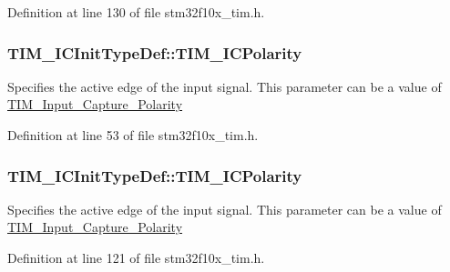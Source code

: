 Definition at line 130 of file stm32f10x\+\_\+tim.\+h.

\subsubsection[{\texorpdfstring{T\+I\+M\+\_\+\+I\+C\+Polarity}{TIM_ICPolarity}}]{ T\+I\+M\+\_\+\+I\+C\+Init\+Type\+Def\+::\+T\+I\+M\+\_\+\+I\+C\+Polarity}\hypertarget{struct_t_i_m___i_c_init_type_def_acb97723cac0cc6f15d574afacda018c1}{}\label{struct_t_i_m___i_c_init_type_def_acb97723cac0cc6f15d574afacda018c1}
Specifies the active edge of the input signal. This parameter can be a value of \hyperlink{group___t_i_m___input___capture___polarity}{T\+I\+M\+\_\+\+Input\+\_\+\+Capture\+\_\+\+Polarity} 

Definition at line 53 of file stm32f10x\+\_\+tim.\+h.

\subsubsection[{\texorpdfstring{T\+I\+M\+\_\+\+I\+C\+Polarity}{TIM_ICPolarity}}]{ T\+I\+M\+\_\+\+I\+C\+Init\+Type\+Def\+::\+T\+I\+M\+\_\+\+I\+C\+Polarity}\hypertarget{struct_t_i_m___i_c_init_type_def_a234c284efc36c0cc15a2ed0fb4435557}{}\label{struct_t_i_m___i_c_init_type_def_a234c284efc36c0cc15a2ed0fb4435557}
Specifies the active edge of the input signal. This parameter can be a value of \hyperlink{group___t_i_m___input___capture___polarity}{T\+I\+M\+\_\+\+Input\+\_\+\+Capture\+\_\+\+Polarity} 

Definition at line 121 of file stm32f10x\+\_\+tim.\+h.

